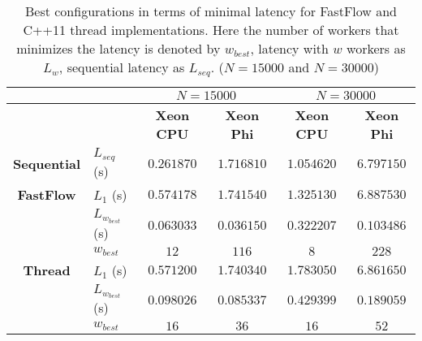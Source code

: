 \begin{table}[h]
	\centering
	\begin{tabular}{clcccc}  
		\toprule
		& & \multicolumn{2}{c}{\textbf{$N = 15000$}} & \multicolumn{2}{c}{\textbf{$N = 30000$}}\\
		\midrule
		& & \textbf{Xeon CPU} & \textbf{Xeon Phi} & \textbf{Xeon CPU} & \textbf{Xeon Phi}\\
		\cmidrule{3-6}		
		\textbf{Sequential} & $L_{seq}$ (\si{s}) & $0.261870$& $1.716810$ & $1.054620$& $6.797150$\\
		\midrule
		\textbf{FastFlow} & $L_1$ (\si{s})& $0.574178$ & $1.741540$ & $1.325130$ & $6.887530$\\
		& $L_{w_{best}}$ (\si{s})& $0.063033$ & $0.036150$ & $0.322207$ & $0.103486$\\
		& $w_{best}$ & $12$ & $116$ & $8$ & $228$\\
		\midrule
		\textbf{Thread} & $L_1$ (\si{s})& $0.571200$ & $1.740340$ & $1.783050$ & $6.861650$\\
		& $L_{w_{best}}$ (\si{s})& $0.098026$ & $0.085337$ & $0.429399$ & $0.189059$\\
		& $w_{best}$ & $16$ & $36$ & $16$ & $52$ \\
		\bottomrule
	\end{tabular}
	\caption{Best configurations in terms of minimal latency for FastFlow and C++11 thread implementations. 
		Here the number of workers that minimizes the latency is denoted by $w_{best}$, latency with $w$ workers as $L_w$, sequential latency as $L_{seq}$. ($N = 15000$ and $N=30000$)}
	\label{tab:res1}
\end{table}